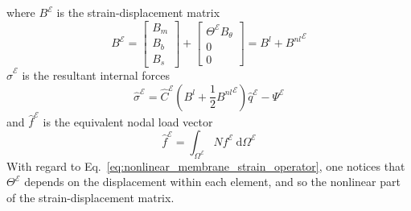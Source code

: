 \documentclass[12pt]{article}
\numberwithin{equation}{section}
\def\el{{ \mathcal{E} }}
\begin{document}
where \( B^\el \) is the strain-displacement matrix
%
\begin{equation}
    B^\el =
    \begin{bmatrix}
        B_m \\
        B_b \\
        B_s
    \end{bmatrix} +
    \begin{bmatrix}
        \Theta^\el B_\theta \\
        0                   \\
        0
    \end{bmatrix}
    = B^l + {B^{nl}}^\el
\end{equation}
% 
\( \hat{\sigma}^\el \) is the resultant internal forces
% 
\begin{equation}
    \hat{\sigma}^\el = \hat{C}^\el
    \left(
    B^l + \frac{1}{2} {B^{nl}}^\el
    \right) \hat{q}^\el -
    \Psi^\el
    \label{eq:sigma_hat_element}
\end{equation}
% 
and \( \hat{f}^\el \) is the equivalent nodal load vector
% 
\begin{equation}
    \hat{f}^\el = \int_{\Omega^\el} \hat{N} f^\el ~ \text{d} \Omega^\el
\end{equation}
%
With regard to Eq.~\eqref{eq:nonlinear_membrane_strain_operator}, one notices that \(\Theta^\el\) depends on the displacement within each element, and so the nonlinear part of the strain-displacement matrix.
\end{document}
